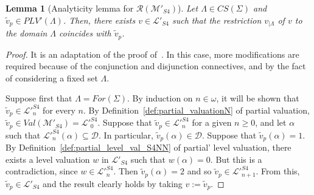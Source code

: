 \documentclass[12pt]{article}
\newtheorem{lemma}[theorem]{Lemma}
\begin{document}
\begin{lemma} [Analyticity lemma for $\mathcal{R}(\mathcal{M}'_{S4})$] \label{analyticityS4} Let $\Lambda \in CS(\Sigma)$ and  $\tilde v_p \in PLV'(\Lambda)$. Then, there exists $v \in \mathcal{L}'_{S4}$ such that the restriction $v_{|\Lambda}$ of $v$ to the domain $\Lambda$ coincides with $\tilde v_p$.
\end{lemma}
\begin{proof} It is an adaptation of the proof of~\cite[Lemma~3.14]{gratz_truth_2022}. In this case, more modifications are required because of the conjunction and disjunction connectives, and by the fact of considering a fixed set $\Lambda$.

Suppose first that $\Lambda=For(\Sigma)$.  By induction on $n \in \omega$, it will be shown that $\tilde v_p \in \mathcal{L}'^{S4}_n$ for every $n$. By Definition~\ref{def:partial_valuationN} of partial valuation, $\tilde v_p \in Val(\mathcal{M}'_{S4})= {\mathcal{L}'}_0^{S4}$. Suppose that $\tilde v_p \in \mathcal{L}'^{S4}_n$ for a given $n \geq 0$, and let $\alpha$ such that $\mathcal{L}'^{S4}_n(\alpha) \subseteq \mathcal{D}$. In particular, $\tilde v_p(\alpha) \in  \mathcal{D}$. Suppose that $\tilde v_p(\alpha)=1$. By Definition~\ref{def:partial_level_val_S4NN} of partial' level valuation,  there exists a level valuation $w$ in $\mathcal{L}'_{S4}$ such that $w(\alpha) = 0$. But this is  a contradiction, since $w \in \mathcal{L}'^{S4}_n$. Then $\tilde v_p(\alpha)=2$ and so $\tilde v_p \in \mathcal{L}'^{S4}_{n+1}$. From this, $\tilde v_p \in \mathcal{L}'_{S4}$ and the result clearly holds by taking $v:=\tilde v_p$.


\end{proof}
\end{document}
